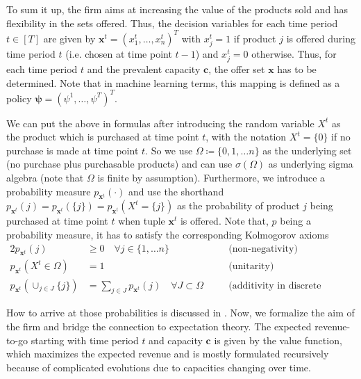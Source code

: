 
To sum it up, the firm aims at increasing the value of the products sold and has flexibility in the sets offered. Thus, the decision variables for each time period $t \in [T]$ are given by $\boldsymbol{x}^t = (x^t_1, \dots, x^t_n)^T$ with $x^t_j = 1$ if product $j$ is offered during time period $t$ (i.e. chosen at time point $t-1$) and $x^t_j = 0$ otherwise. Thus, for each time period $t$ and the prevalent capacity $\boldsymbol{c}$, the offer set $\boldsymbol{x}$ has to be determined. Note that in machine learning terms, this mapping is defined as a policy $\boldsymbol{\psi} = (\psi^1, \dots, \psi^T)^T$.

We can put the above in formulas after introducing the random variable $X^t$ as the product which is purchased at time point $t$, with the notation $X^t=\{0\}$ if no purchase is made at time point $t$. 
So we use $\Omega \coloneqq \{0, 1, \dots n\}$ as the underlying set (no purchase plus purchasable products) and can use $\sigma(\Omega)$ as underlying sigma algebra (note that $\Omega$ is finite by assumption). 
Furthermore, we introduce a probability measure $p_{\boldsymbol{x}^t}(\cdot)$ 
and use the shorthand $p_{\boldsymbol{x}^t}(j) = p_{\boldsymbol{x}^t}(\{j\}) = p_{\boldsymbol{x}^t}(X^t = \{j\})$ as the probability of product $j$ being purchased at time point $t$ when tuple $\boldsymbol{x}^t$ is offered. Note that, $p$ being a probability measure, it has to satisfy the corresponding Kolmogorov axioms 
\begin{alignat}{2}
p_{\boldsymbol{x}^t}(j) &\geq 0 \quad \forall j \in \{1, \dots n\} \quad &&\text{(non-negativity)}\\
p_{\boldsymbol{x}^t}(X^t \in \Omega) &= 1 &&\text{(unitarity)}\\
p_{\boldsymbol{x}^t}(\cup_{j \in J}\{j\}) &= \sum_{j \in J}p_{\boldsymbol{x}^t}(j) \quad \forall J \subset \Omega \quad &&\text{(additivity in discrete setting)}
\end{alignat}

How to arrive at those probabilities is discussed in . Now, we formalize the aim of the firm and bridge the connection to expectation theory. The expected revenue-to-go starting with time period $t$ and capacity $\boldsymbol{c}$ is given by the value function, which maximizes the expected revenue and is mostly formulated recursively because of complicated evolutions due to capacities changing over time.

